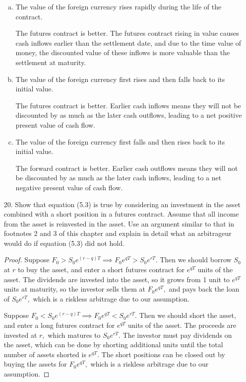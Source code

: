 \documentclass{article}
\begin{document}
\begin{itemize}
\begin{enumerate}[(a)]
			\item The value of the foreign currency rises rapidly during the life of the contract.
				\begin{answer*}
					The futures contract is better. The futures contract rising in value causes cash inflows earlier than the settlement date, and due to the time value of money, the discounted value of these inflows is more valuable than the settlement at maturity.
				\end{answer*}

			\item The value of the foreign currency first rises and then falls back to its initial value.
				\begin{answer*}
					The futures contract is better. Earlier cash inflows means they will not be discounted by as much as the later cash outflows, leading to a net positive present value of cash flow.
				\end{answer*}

			\item The value of the foreign currency first falls and then rises back to its initial value.
				\begin{answer*}
					The forward contract is better. Earlier cash outflows means they will not be discounted by as much as the later cash inflows, leading to a net negative present value of cash flow.
				\end{answer*}

		\end{enumerate}

	\item[20.] Show that equation (5.3) is true by considering an investment in the asset combined with a short position in a futures contract. Assume that all income from the asset is reinvested in the asset. Use an argument similar to that in footnotes 2 and 3 of this chapter and explain in detail what an arbitrageur would do if equation (5.3) did not hold.
		\begin{proof}
			Suppose $F_0>S_0e^{(r-q)T}\implies F_0e^{qT}>S_0e^{rT}.$ Then we should borrow $S_0$ at $r$ to buy the asset, and enter a short futures contract for $e^{qT}$ units of the asset. The dividends are invested into the asset, so it grows from 1 unit to $e^{qT}$ units at maturity, so the investor sells them at $F_0e^{qT},$ and pays back the loan of $S_0e^{rT},$ which is a riskless arbitrage due to our assumption. 

			Suppose $F_0<S_0e^{(r-q)T}\implies F_0e^{qT}<S_0e^{rT}.$ Then we should short the asset, and enter a long futures contract for $e^{qT}$ units of the asset. The proceeds are invested at $r,$ which matures to $S_0e^{rT}.$ The investor must pay dividends on the asset, which can be done by shorting additional units until the total number of assets shorted is $e^{qT}.$ The short positions can be closed out by buying the assets for $F_0e^{qT},$ which is a riskless arbitrage due to our assumption.


\end{proof}
\end{itemize}
\end{document}
